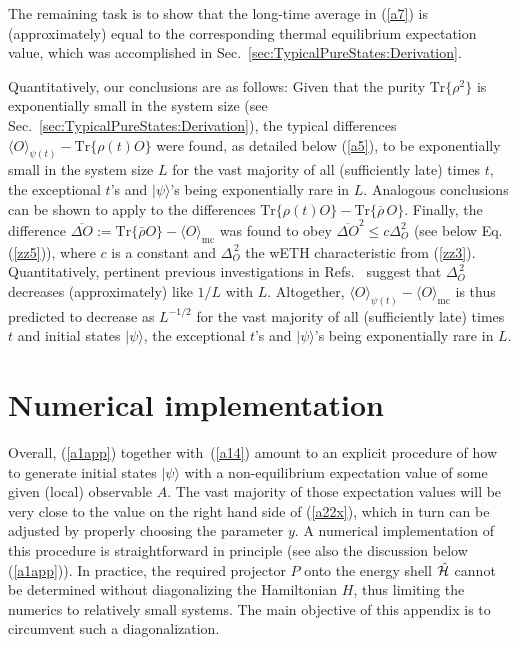 \documentclass[twocolumn,aps,prb,floatfix,superscriptaddress]{revtex4-2}
\newcommand{\<}{\left\langle}	%
\renewcommand{\>}{\right\rangle}	%
\newcommand{\tr}{\mbox{Tr}}
\newcommand{\hr}{{\cal H}}
\newcommand{\Omc}{\langle O\rangle_{\!\mathrm{mc}}}
\newcommand{\mref}[1]{\ref{#1}}
\begin{document}
The remaining task is to show that the long-time 
average in (\ref{a7}) is (approximately) equal to the
corresponding thermal equilibrium expectation 
value,
which was accomplished in Sec.~\ref{sec:TypicalPureStates:Derivation}.

Quantitatively, our conclusions are as follows:
Given that the purity $\tr\{\rho^2\}$ is exponentially 
small in the system size (see Sec.~\ref{sec:TypicalPureStates:Derivation}), 
the typical differences
$\langle O\rangle_{\! \psi(t)} - \tr\{\rho(t) O\}$
were found, as detailed below (\ref{a5}), 
to be exponentially small in the system size $L$
for the vast majority of all (sufficiently late) times $t$,
the exceptional $t$'s and $|\psi\rangle$'s being 
exponentially rare in $L$.
Analogous conclusions can be shown \cite{equil}
to apply to the differences
$\tr\{\rho(t) O\}-\tr\{\overline{\rho}\,O\}$.
Finally, the difference
$\overline{\Delta O} := \tr\{\bar\rho O\} - \Omc$
was found to obey 
$\overline{\Delta O}^2 \leq c \Delta_O^2$
(see below Eq. (\mref{zz5})),
where $c$ is a constant and  $\Delta_O^{\,2}$ 
the wETH characteristic from (\mref{zz3}).
Quantitatively, pertinent previous investigations in 
Refs.~\cite{bir10,alb15,mor16,iyo17,mor18,yos18,kuw20,kuw20a}
suggest that $\Delta_O^{\,2}$  
decreases (approximately) like $1/L$ 
with $L$.
Altogether, $\langle O\rangle_{\!\psi(t)}-\Omc$ 
is thus predicted to decrease 
as $L^{-1/2}$ for the vast majority of all (sufficiently late) 
times $t$ and initial states $|\psi\rangle$,
the exceptional $t$'s and $|\psi\rangle$'s 
being exponentially rare in $L$.


\section{Numerical implementation}
\label{app:B}

Overall, (\ref{a1app}) together with~(\ref{a14}) amount to
an explicit procedure of how to generate
initial states $|\psi\rangle$ 
with a 
non-equilibrium
expectation value of some given (local) observable $A$.
The vast majority of those expectation values will
be very close to the value on the right
hand side of (\mref{a22x}), which in turn 
can be adjusted by properly choosing the 
parameter $y$.
A numerical implementation of this
procedure is straightforward in principle
(see also the discussion below (\ref{a1app})).
In practice, the required projector $P$ 
onto the energy shell $\hat \hr$ cannot be determined 
without diagonalizing the Hamiltonian $H$,
thus limiting the numerics to relatively 
small systems.
The main objective of this appendix is to circumvent
such a diagonalization.
\end{document}
